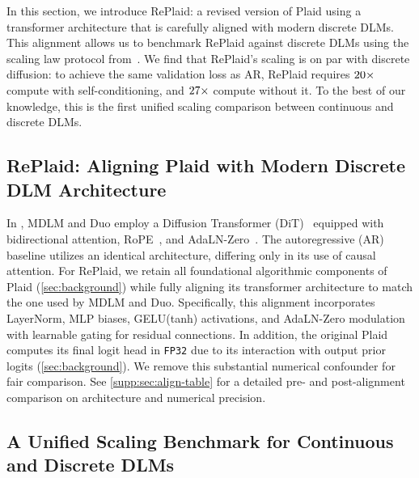 \documentclass{article}
\begin{document}
%

%

%

In this section, we introduce RePlaid: a revised version of Plaid using a transformer architecture that is carefully aligned with modern discrete DLMs. This alignment allows us to benchmark RePlaid against discrete DLMs using the scaling law protocol from~\citet{sahoo2026scaling}. We find that RePlaid's scaling is on par with discrete diffusion: to achieve the same validation loss as AR, RePlaid requires $20\times$ compute with self-conditioning, and $27\times$ compute without it. To the best of our knowledge, this is the first unified scaling comparison between continuous and discrete DLMs.

%
%

\subsection{RePlaid: Aligning Plaid with Modern Discrete DLM Architecture}\label{subsec:replaid-align}

In \citet{sahoo2026scaling}, MDLM and Duo employ a Diffusion Transformer (DiT)~\citep{peebles2023scalable} equipped with bidirectional attention, RoPE~\citep{su2021roformer}, and AdaLN-Zero~\citep{peebles2023scalable}. The autoregressive (AR) baseline utilizes an identical architecture, differing only in its use of causal attention. For RePlaid, we retain all foundational algorithmic components of Plaid (\cref{sec:background}) while fully aligning its transformer architecture to match the one used by MDLM and Duo. Specifically, this alignment incorporates LayerNorm, MLP biases, GELU(tanh) activations, and AdaLN-Zero modulation with learnable gating for residual connections. In addition, the original Plaid computes its final logit head in \texttt{FP32} due to its interaction with output prior logits (\cref{sec:background}). We remove this substantial numerical confounder for fair comparison. See \cref{supp:sec:align-table} for a detailed pre- and post-alignment comparison on architecture and numerical precision.

%

%
%

%
 

\subsection{A Unified Scaling Benchmark for Continuous and Discrete DLMs} 
\label{subsec:scaling-law-setup}
\end{document}
